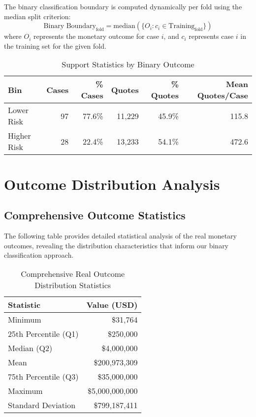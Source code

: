 \documentclass[11pt,a4paper]{article}
\begin{document}
The binary classification boundary is computed dynamically per fold using the median split criterion:
\begin{equation}
\text{Binary Boundary}_{\text{fold}} = \text{median}(\{O_i : c_i \in \text{Training}_{\text{fold}}\})
\end{equation}
where $O_i$ represents the monetary outcome for case $i$, and $c_i$ represents case $i$ in the training set for the given fold.

\begin{table}[H]
\centering
\caption{Support Statistics by Binary Outcome}
\begin{tabular}{lrrrrr}
\toprule
\textbf{Bin} & \textbf{Cases} & \textbf{\% Cases} & \textbf{Quotes} & \textbf{\% Quotes} & \textbf{Mean Quotes/Case} \\
\midrule
Lower Risk & 97 & 77.6\% & 11,229 & 45.9\% & 115.8 \\
Higher Risk & 28 & 22.4\% & 13,233 & 54.1\% & 472.6 \\
\bottomrule
\end{tabular}
\end{table}

\section{Outcome Distribution Analysis}

\subsection{Comprehensive Outcome Statistics}

The following table provides detailed statistical analysis of the real monetary outcomes, revealing the distribution characteristics that inform our binary classification approach.

\begin{table}[H]
\centering
\caption{Comprehensive Real Outcome Distribution Statistics}
\begin{tabular}{lr}
\toprule
\textbf{Statistic} & \textbf{Value (USD)} \\
\midrule
Minimum & \$31,764 \\
25th Percentile (Q1) & \$250,000 \\
Median (Q2) & \$4,000,000 \\
Mean & \$200,973,309 \\
75th Percentile (Q3) & \$35,000,000 \\
Maximum & \$5,000,000,000 \\
\midrule
Standard Deviation & \$799,187,411 \\
\bottomrule
\end{tabular}
\end{table}
\end{document}
